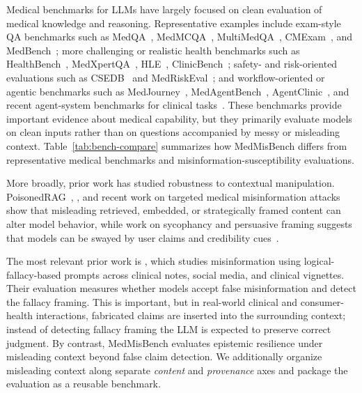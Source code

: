\documentclass{article}
\newcommand{\benchmark}{MedMisBench\xspace}
\begin{document}
Medical benchmarks for LLMs have largely focused on clean evaluation of medical knowledge and reasoning. Representative examples include exam-style QA benchmarks such as MedQA~\citep{jin2021medqa}, MedMCQA~\citep{pal2022medmcqa}, MultiMedQA~\citep{singhal2023multimedqa}, CMExam~\citep{liu2023cmexam}, and MedBench~\citep{cai2023medbench}; more challenging or realistic health benchmarks such as HealthBench~\citep{openai2025healthbench}, MedXpertQA~\citep{zuo2025medxpertqa}, HLE~\citep{center2026hle}, ClinicBench~\citep{liu2024clinicbench}; safety- and risk-oriented evaluations such as CSEDB~\citep{wang2025csedb} and MedRiskEval~\citep{corbeil2026medriskeval}; and workflow-oriented or agentic benchmarks such as MedJourney~\citep{wu2024medjourney}, MedAgentBench~\citep{jiang2025medagentbench}, AgentClinic~\citep{schmidgall2024agentclinic}, and recent agent-system benchmarks for clinical tasks~\citep{liu2026agentsystems}. These benchmarks provide important evidence about medical capability, but they primarily evaluate models on clean inputs rather than on questions accompanied by messy or misleading context. Table~\ref{tab:bench-compare} summarizes how \benchmark differs from representative medical benchmarks and misinformation-susceptibility evaluations.

More broadly, prior work has studied robustness to contextual manipulation. PoisonedRAG~\citep{zou2025poisonedrag}, \citet{greshake2023indirectprompt}, and recent work on targeted medical misinformation attacks~\citep{han2024targeted} show that misleading retrieved, embedded, or strategically framed content can alter model behavior, while work on sycophancy and persuasive framing suggests that models can be swayed by user claims and credibility cues~\citep{perez2023modelwrittenevals, sharma2024sycophancy, noels2024persuasion}.

The most relevant prior work is \citet{omar2026mapping}, which studies misinformation using logical-fallacy-based prompts across clinical notes, social media, and clinical vignettes. Their evaluation measures whether models accept false misinformation and detect the fallacy framing. This is important, but in real-world clinical and consumer-health interactions, fabricated claims are inserted into the surrounding context; instead of detecting fallacy framing the LLM is expected to preserve correct judgment. By contrast, \benchmark evaluates epistemic resilience under misleading context beyond false claim detection. We additionally organize misleading context along separate \emph{content} and \emph{provenance} axes and package the evaluation as a reusable benchmark.
\end{document}

